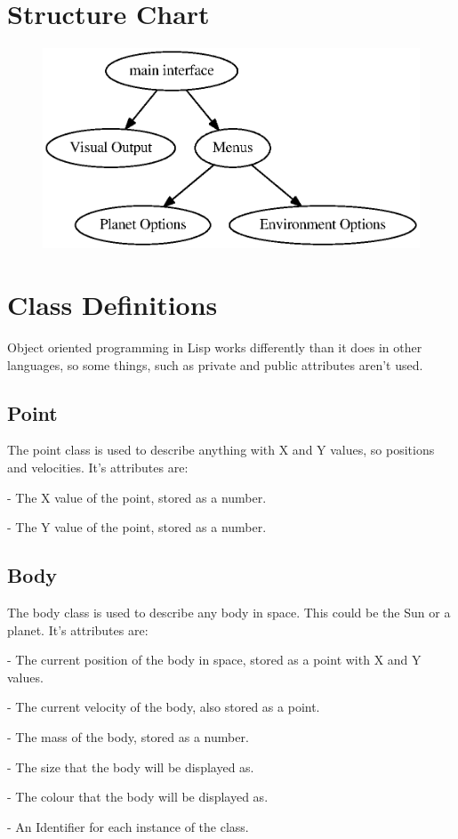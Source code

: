 \section{Structure Chart}
\begin{figure}[h]
	\includegraphics[width=\textwidth]{./img/hier.eps}
\end{figure}

\section{Class Definitions}
Object oriented programming in Lisp works differently than it does in other
languages, so some things, such as private and public attributes aren't used. 

\subsection{Point} The point class is used to describe anything with X and Y
values, so positions and velocities. It's attributes are:
\begin{description}[\parindent]
	\item[X] - The X value of the point, stored as a number.
	\item[Y] - The Y value of the point, stored as a number.
\end{description}

\subsection{Body} The body class is used to describe any body in space. This
could be the Sun or a planet. It's attributes are:
\begin{description}[\parindent]
	\item[pos] - The current position of the body in space, stored as a
		point with X and Y values.
	\item[vel] - The current velocity of the body, also stored as a point.
	\item[mass] - The mass of the body, stored as a number.
	\item[size] - The size that the body will be displayed as.
	\item[colour] - The colour that the body will be displayed as.
	\item[id] - An Identifier for each instance of the class.
\end{description} \\

